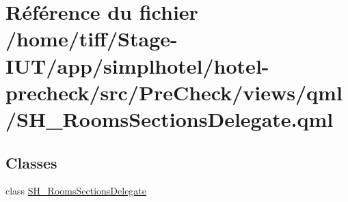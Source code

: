 \hypertarget{SH__RoomsSectionsDelegate_8qml}{\section{Référence du fichier /home/tiff/\-Stage-\/\-I\-U\-T/app/simplhotel/hotel-\/precheck/src/\-Pre\-Check/views/qml/\-S\-H\-\_\-\-Rooms\-Sections\-Delegate.qml}
\label{SH__RoomsSectionsDelegate_8qml}
}
\subsection*{Classes}
\begin{DoxyCompactItemize}
\item 
class \hyperlink{classSH__RoomsSectionsDelegate}{S\-H\-\_\-\-Rooms\-Sections\-Delegate}
\end{DoxyCompactItemize}
